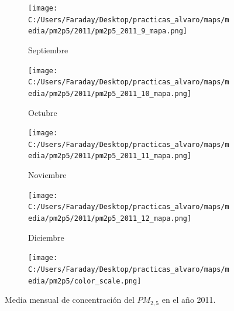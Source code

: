 \documentclass[12pt]{beamer}
\begin{document}
\begin{frame}[squeeze]
\begin{figure}[H]
\begin{subfigure}[H]{0.20\textwidth}
\texttt{[image: C:/Users/Faraday/Desktop/practicas\_alvaro/maps/media/pm2p5/2011/pm2p5\_2011\_9\_mapa.png]}
\captionsetup{labelformat=empty}
\caption{\scriptsize Septiembre}
\label{fig:map-pm2p5-2011-9}
\end{subfigure}
%
\begin{subfigure}[H]{0.20\textwidth}
\texttt{[image: C:/Users/Faraday/Desktop/practicas\_alvaro/maps/media/pm2p5/2011/pm2p5\_2011\_10\_mapa.png]}
\captionsetup{labelformat=empty}
\caption{\scriptsize Octubre}
\label{fig:map-pm2p5-2011-10}
\end{subfigure}
%
\begin{subfigure}[H]{0.20\textwidth}
\texttt{[image: C:/Users/Faraday/Desktop/practicas\_alvaro/maps/media/pm2p5/2011/pm2p5\_2011\_11\_mapa.png]}
\captionsetup{labelformat=empty}
\caption{\scriptsize Noviembre}
\label{fig:map-pm2p5-2011-11}
\end{subfigure}
%
\begin{subfigure}[H]{0.20\textwidth}
\texttt{[image: C:/Users/Faraday/Desktop/practicas\_alvaro/maps/media/pm2p5/2011/pm2p5\_2011\_12\_mapa.png]}
\captionsetup{labelformat=empty}
\caption{\scriptsize Diciembre}
\label{fig:map-pm2p5-2011-12}
\end{subfigure}

\begin{subfigure}[H]{0.45\textwidth}
\texttt{[image: C:/Users/Faraday/Desktop/practicas\_alvaro/maps/media/pm2p5/color\_scale.png]}
\captionsetup{labelformat=empty}
\caption{}
\end{subfigure}

\vspace*{-7mm}
\caption{\scriptsize Media mensual de concentración del $PM_{2,5}$ en el año 2011.}
\label{fig:map-pm2p5-2011}
\end{figure}
\end{frame}
\end{document}
